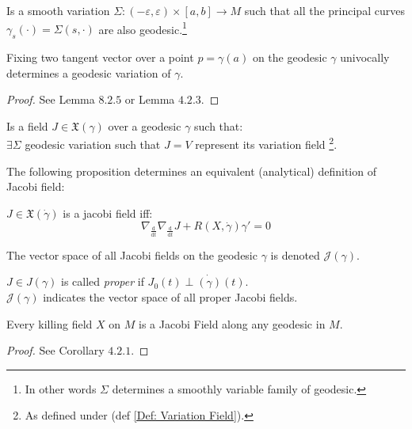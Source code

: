 \documentclass[a4paper,12pt]{scrartcl}    %
\begin{document}
\begin{definition}
Is a smooth variation $\Sigma:(-\varepsilon, \varepsilon) \times [a,b] \rightarrow M$ such that all the principal curves $\gamma_s (\cdot) = \Sigma(s,\cdot)$ are also geodesic.\footnote{In other words $\Sigma$ determines a smoothly variable family of geodesic.}
\end{definition}

\begin{proposition}
 Fixing two tangent vector over a point $p= \gamma(a)$ on the geodesic $\gamma$ univocally determines 
 a geodesic variation of $\gamma$.
\end{proposition}
\begin{proof}
 See \cite{Abate2011} Lemma $8.2.5$  or \cite{Jost2005} Lemma $4.2.3$.
\end{proof}

\begin{definition}
 Is a field $J \in \mathfrak{X}(\gamma)$ over a geodesic $\gamma$ such that:
 \\
 $\exists \Sigma$ geodesic variation such that $J=V$ represent its variation field \footnote{As defined under (def \ref{Def: Variation Field}).}.
\end{definition}
The following proposition determines an equivalent (analytical) definition of Jacobi field:

\begin{proposition}
$$ $$
 $J \in \mathfrak{X}(\dot{\gamma})$ is a jacobi field iff:
 \begin{displaymath}
   \nabla_{\frac{\textrm{d}}{\textrm{d}t}} \nabla_{\frac{\textrm{d}}{\textrm{d}t}} J  + R(X,\dot{\gamma}) \gamma' = 0
 \end{displaymath}
\end{proposition}

\begin{notationfix}
The vector space of all Jacobi fields on the geodesic $\gamma$ is denoted $\mathcal{J}(\gamma)$.
\end{notationfix}
\begin{notationfix}
 $J \in J(\gamma)$ is called \emph{proper} if $J_0(t)\perp \dot{(\gamma)}(t)$.
\\
 $\mathcal{J}(\gamma)$ indicates the vector space of all proper Jacobi fields.
\end{notationfix}

\begin{proposition}
Every killing field $X$ on $M$ is a Jacobi Field along any geodesic in $M$.
\end{proposition}
\begin{proof}
 See \cite{Jost2005} Corollary $4.2.1$.
\end{proof}
\end{document}
